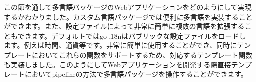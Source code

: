 この節を通して多言語パッケージのWebアプリケーションをどのようにして実現するかわかりました。カスタム言語パッケージでは便利に多言語を実装することができます。また、設定ファイルによって非常に簡単に複数の言語を拡張することもできます。デフォルトではgo-i18nはパブリックな設定ファイルをロードします。例えば時間、通貨等です。非常に簡単に使用することができ、同時にテンプレートにおいてこれらの関数をサポートするため、対応するテンプレート関数も実装しました。このようにしてWebアプリケーションを開発する際直接テンプレートにおいてpipelineの方法で多言語パッケージを操作することができます。
